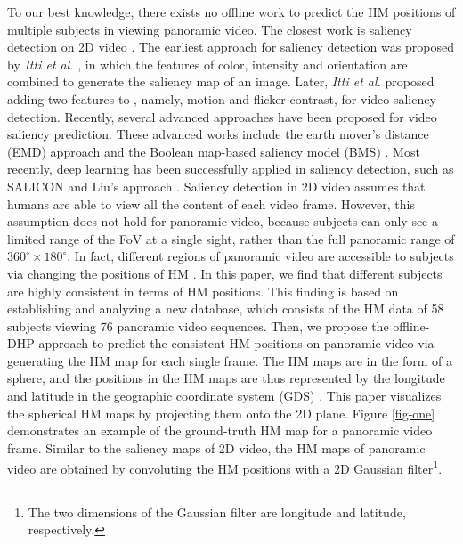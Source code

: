 \documentclass[10pt,journal,compsoc]{IEEEtran}
\begin{document}
To our best knowledge, there exists no offline work to predict the HM positions of multiple subjects in viewing panoramic video. The closest work is saliency detection on 2D video \cite{borji2013state}. The earliest approach for saliency detection was proposed by \textit{Itti et al.} \cite{itti1998model}, in which the features of color, intensity and orientation are combined to generate the saliency map of an image. Later, \textit{Itti et al.} \cite{itti2004automatic} proposed adding two features to \cite{itti1998model}, namely, motion and flicker contrast, for video saliency detection. Recently, several advanced approaches have been proposed for video saliency prediction. These advanced works include  the earth mover's distance (EMD) approach \cite{lin2013visual} and the Boolean map-based saliency model (BMS) \cite{zhang2016exploiting}.
Most recently, deep learning has been successfully applied in saliency detection,
such as SALICON \cite{huang2015salicon} and Liu's approach \cite{Liu2017cvpr}.
Saliency detection in 2D video assumes that humans are able to view all the content of each video frame.
However, this assumption does not hold for panoramic video, because subjects can only see a limited range of the FoV at a single sight, rather than the full panoramic range of $360^{\circ} \times 180^{\circ}$.
In fact, different regions of panoramic video are accessible to subjects via changing the positions of HM \cite{lowe2015visualization}.
In this paper, we find that different subjects are highly consistent in terms of HM positions.
This finding is based on establishing and analyzing a new database, which consists of the HM data of 58 subjects viewing 76 panoramic video sequences.
Then, we propose the offline-DHP approach to predict the consistent HM positions on panoramic video via generating the HM map for each single frame.
The HM maps are in the form of a sphere, and the positions in the HM maps are thus represented by the longitude and latitude in the geographic coordinate system (GDS) \cite{Goodchild2007}. This paper visualizes the spherical HM maps by projecting them onto the 2D plane.
Figure \ref{fig-one} demonstrates an example of the ground-truth HM map for a panoramic video frame. Similar to the saliency maps of 2D video, the HM maps of panoramic video are obtained by convoluting the HM positions with a 2D Gaussian filter\footnote{The two dimensions of the Gaussian filter are longitude and latitude, respectively.}.

\end{document}
